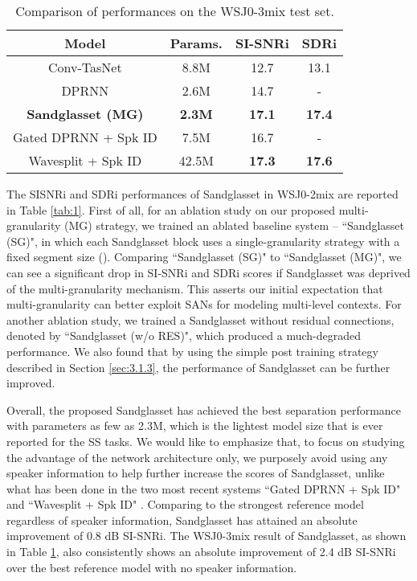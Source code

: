 \documentclass{article}
\begin{document}
\begin{table}[t]
\caption{Comparison of performances on the WSJ0-3mix test set.}
\label{tab:2}
\centering

\begin{tabular}{c|c|c|c}
\hline
\textbf{Model} & \textbf{Params.} & \textbf{SI-SNRi} & \textbf{SDRi} \\
\hline
{Conv-TasNet \cite{luo2019conv}} & 8.8M & 12.7 & 13.1 \\
{DPRNN \cite{luo2019dual}} & 2.6M & 14.7 & -  \\ 
{\bf{Sandglasset (MG)}} & \bf{2.3M} & \bf{17.1} & \bf{17.4} \\\hline
{Gated DPRNN + Spk ID \cite{nachmani2020voice}} & 7.5M & 16.7 & - \\
{Wavesplit + Spk ID \cite{zeghidour2020wavesplit}} & 42.5M & \bf{17.3} & \bf{17.6} \\
\hline
\end{tabular}
\vspace{-3mm}
\end{table}
The SISNRi and SDRi performances of Sandglasset in WSJ0-2mix are reported in Table \ref{tab:1}. First of all, for an ablation study on our proposed multi-granularity (MG) strategy, we trained an ablated baseline system -- ``Sandglasset (SG)", in which each Sandglasset block uses a single-granularity strategy with a fixed segment size (). Comparing ``Sandglasset (SG)" to ``Sandglasset (MG)", we can see a significant drop in SI-SNRi and SDRi scores if Sandglasset was deprived of the multi-granularity mechanism. This asserts our initial expectation that multi-granularity can better exploit SANs for modeling multi-level contexts. For another ablation study, we trained a Sandglasset without residual connections, denoted by ``Sandglasset (w/o RES)", which produced a much-degraded performance. We also found that by using the simple post training strategy described in Section \ref{sec:3.1.3}, the performance of Sandglasset can be further improved.

Overall, the proposed Sandglasset has achieved the best separation performance with parameters as few as 2.3M, which is the lightest model size that is ever reported for the SS tasks. We would like to emphasize that, to focus on studying the advantage of the network architecture only, we purposely avoid using any speaker information to help further increase the scores of Sandglasset, unlike what has been done in the two most recent systems ``Gated DPRNN + Spk ID"  \cite{nachmani2020voice} and ``Wavesplit + Spk ID" \cite{zeghidour2020wavesplit}. Comparing to the strongest reference model regardless of speaker information, Sandglasset has attained an absolute improvement of 0.8 dB SI-SNRi. The WSJ0-3mix result of Sandglasset, as shown in Table \ref{tab:2}, also consistently shows an absolute improvement of 2.4 dB SI-SNRi over the best reference model with no speaker information. 
\end{document}
